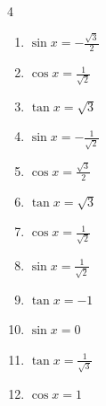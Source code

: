 \begin{multicols}{4}
\begin{enumerate}
  \item $\displaystyle \sin{x}  = -\frac{\sqrt{3}}{2}$


  \item $\displaystyle \cos{x}  = \frac{1}{\sqrt{2}}$


  \item $\displaystyle \tan{x}  = \sqrt{3}$


  \item $\displaystyle \sin{x}  = -\frac{1}{\sqrt{2}}$


  \item $\displaystyle \cos{x}  = \frac{\sqrt{3}}{2}$


  \item $\displaystyle \tan{x}  = \sqrt{3}$


  \item $\displaystyle \cos{x}  = \frac{1}{\sqrt{2}}$


  \item $\displaystyle \sin{x}  = \frac{1}{\sqrt{2}}$


  \item $\displaystyle \tan{x}  = -1$


  \item $\displaystyle \sin{x}  = 0$


  \item $\displaystyle \tan{x}  = \frac{1}{\sqrt{3}}$


  \item $\displaystyle \cos{x}  = 1$


\end{enumerate}
\end{multicols}
